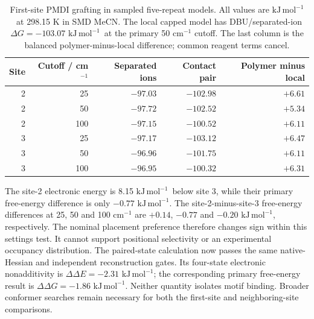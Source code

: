 \documentclass[11pt]{article}
\newcommand{\kj}{\ensuremath{\mathrm{kJ\,mol^{-1}}}}
\begin{document}
\begin{table}[htbp]\centering\small
\caption{First-site PMDI grafting in sampled five-repeat models. All values are \kj\ at 298.15 K in SMD MeCN. The local capped model has DBU/separated-ion $\Delta G=-103.07$ \kj\ at the primary 50 cm$^{-1}$ cutoff. The last column is the balanced polymer-minus-local difference; common reagent terms cancel.}
\begin{tabular}{rrrrr}\toprule
Site & Cutoff / cm$^{-1}$ & Separated ions & Contact pair & Polymer minus local\\\midrule
2 & 25  & $-97.03$ & $-102.98$ & $+6.61$\\
2 & 50  & $-97.72$ & $-102.52$ & $+5.34$\\
2 & 100 & $-97.15$ & $-100.52$ & $+6.11$\\
3 & 25  & $-97.17$ & $-103.12$ & $+6.47$\\
3 & 50  & $-96.96$ & $-101.75$ & $+6.11$\\
3 & 100 & $-96.95$ & $-100.32$ & $+6.31$\\\bottomrule
\end{tabular}\label{tab:pmdifirstsite}\end{table}

The site-2 electronic energy is 8.15 \kj\ below site 3, while their primary free-energy difference is only $-0.77$ \kj. The site-2-minus-site-3 free-energy differences at 25, 50 and 100 cm$^{-1}$ are $+0.14$, $-0.77$ and $-0.20$ \kj, respectively. The nominal placement preference therefore changes sign within this settings test. It cannot support positional selectivity or an experimental occupancy distribution. The paired-state calculation now passes the same native-Hessian and independent reconstruction gates. Its four-state electronic nonadditivity is $\Delta\Delta E=-2.31$ \kj; the corresponding primary free-energy result is $\Delta\Delta G=-1.86$ \kj. Neither quantity isolates motif binding. Broader conformer searches remain necessary for both the first-site and neighboring-site comparisons.
\end{document}
